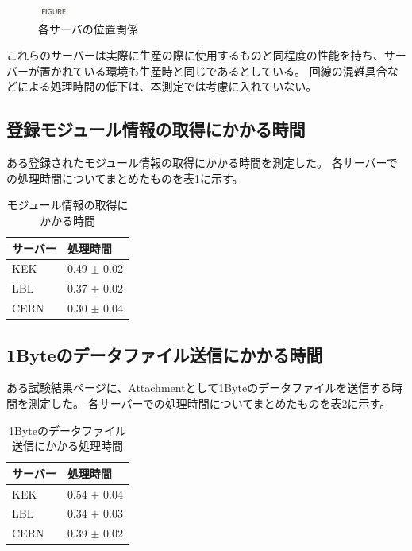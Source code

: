 \begin{figure}[bpt]\centering
\includegraphics[width=1cm]{figure}
\caption[各サーバの位置関係]{各サーバの位置関係}
\label{server_position}
\end{figure}

これらのサーバーは実際に生産の際に使用するものと同程度の性能を持ち、サーバーが置かれている環境も生産時と同じであるとしている。
回線の混雑具合などによる処理時間の低下は、本測定では考慮に入れていない。

\subsection{登録モジュール情報の取得にかかる時間}
ある登録されたモジュール情報の取得にかかる時間を測定した。
各サーバーでの処理時間についてまとめたものを表\ref{getting_1module}に示す。

\begin{table}[tbp]
\begin{center}
\caption[モジュール情報の取得にかかる時間]{モジュール情報の取得にかかる時間}
\label{getting_1module}
  \begin{tabular}{|ll|} \hline
    サーバー & 処理時間 \\ \hline
    KEK & 0.49 $\pm$ 0.02 \\ 
    LBL & 0.37 $\pm$ 0.02 \\ 
    CERN & 0.30 $\pm$ 0.04 \\ \hline 
  \end{tabular}
\end{center}
\end{table}

\subsection{1Byteのデータファイル送信にかかる時間}
ある試験結果ページに、Attachmentとして1Byteのデータファイルを送信する時間を測定した。
各サーバーでの処理時間についてまとめたものを表\ref{sendpd_1byte}に示す。

\begin{table}[tbp]
\begin{center}
\caption[1Byteのデータファイル送信にかかる処理時間]{1Byteのデータファイル送信にかかる処理時間}
\label{sendpd_1byte}
  \begin{tabular}{|ll|} \hline
    サーバー & 処理時間 \\ \hline
    KEK & 0.54 $\pm$ 0.04 \\ 
    LBL & 0.34 $\pm$ 0.03 \\ 
    CERN & 0.39 $\pm$ 0.02 \\ \hline 
  \end{tabular}
\end{center}
\end{table}

